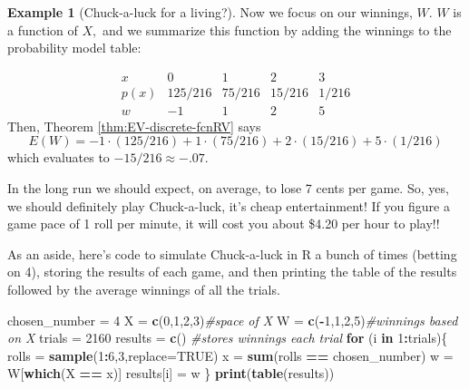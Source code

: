 \documentclass[
]{book}
\newenvironment{Shaded}{\begin{snugshade}}{\end{snugshade}}
\newcommand{\AttributeTok}[1]{\textcolor[rgb]{0.13,0.29,0.53}{#1}}
\newcommand{\CommentTok}[1]{\textcolor[rgb]{0.56,0.35,0.01}{\textit{#1}}}
\newcommand{\ConstantTok}[1]{\textcolor[rgb]{0.56,0.35,0.01}{#1}}
\newcommand{\ControlFlowTok}[1]{\textcolor[rgb]{0.13,0.29,0.53}{\textbf{#1}}}
\newcommand{\DecValTok}[1]{\textcolor[rgb]{0.00,0.00,0.81}{#1}}
\newcommand{\FunctionTok}[1]{\textcolor[rgb]{0.13,0.29,0.53}{\textbf{#1}}}
\newcommand{\NormalTok}[1]{#1}
\newcommand{\OtherTok}[1]{\textcolor[rgb]{0.56,0.35,0.01}{#1}}
\newcommand{\SpecialCharTok}[1]{\textcolor[rgb]{0.81,0.36,0.00}{\textbf{#1}}}
\theoremstyle{definition}
\theoremstyle{definition}
\newtheorem{example}{Example}[chapter]
\theoremstyle{definition}
\theoremstyle{definition}
\theoremstyle{remark}
\begin{document}
\begin{example}[Chuck-a-luck for a living?]
\protect\hypertarget{exm:Chuckaluck-winnings}{}\label{exm:Chuckaluck-winnings}Now we focus on our winnings, \(W\). \(W\) is a function of \(X,\) and we summarize this function by adding the winnings to the probability model table:

\[
\begin{array}{c|c|c|c|c}
x & 0 & 1 & 2 & 3 \\ \hline
p(x) & 125/216 & 75/216 & 15/216 & 1/216 \\ \hline
w & -1 & 1 & 2 & 5
\end{array}
\]
Then, Theorem \ref{thm:EV-discrete-fcnRV} says \[E(W) = -1\cdot(125/216) + 1 \cdot (75/216) + 2 \cdot (15/216) + 5\cdot (1/216)\] which evaluates to \(-15/216 \approx -.07\).

In the long run we should expect, on average, to lose 7 cents per game. So, yes, we should definitely play Chuck-a-luck, it's cheap entertainment! If you figure a game pace of 1 roll per minute, it will cost you about \$4.20 per hour to play!!
\end{example}

As an aside, here's code to simulate Chuck-a-luck in R a bunch of times (betting on 4), storing the results of each game, and then printing the table of the results followed by the average winnings of all the trials.

\begin{Shaded}
\begin{Highlighting}[]
\NormalTok{chosen\_number }\OtherTok{=} \DecValTok{4}
\NormalTok{X }\OtherTok{=} \FunctionTok{c}\NormalTok{(}\DecValTok{0}\NormalTok{,}\DecValTok{1}\NormalTok{,}\DecValTok{2}\NormalTok{,}\DecValTok{3}\NormalTok{)}\CommentTok{\#space of X}
\NormalTok{W }\OtherTok{=} \FunctionTok{c}\NormalTok{(}\SpecialCharTok{{-}}\DecValTok{1}\NormalTok{,}\DecValTok{1}\NormalTok{,}\DecValTok{2}\NormalTok{,}\DecValTok{5}\NormalTok{)}\CommentTok{\#winnings based on X}
\NormalTok{trials }\OtherTok{=} \DecValTok{2160}
\NormalTok{results }\OtherTok{=} \FunctionTok{c}\NormalTok{() }\CommentTok{\#stores winnings each trial }
\ControlFlowTok{for}\NormalTok{ (i }\ControlFlowTok{in} \DecValTok{1}\SpecialCharTok{:}\NormalTok{trials)\{}
\NormalTok{  rolls }\OtherTok{=} \FunctionTok{sample}\NormalTok{(}\DecValTok{1}\SpecialCharTok{:}\DecValTok{6}\NormalTok{,}\DecValTok{3}\NormalTok{,}\AttributeTok{replace=}\ConstantTok{TRUE}\NormalTok{)}
\NormalTok{  x }\OtherTok{=} \FunctionTok{sum}\NormalTok{(rolls }\SpecialCharTok{==}\NormalTok{ chosen\_number)}
\NormalTok{  w }\OtherTok{=}\NormalTok{ W[}\FunctionTok{which}\NormalTok{(X }\SpecialCharTok{==}\NormalTok{ x)]}
\NormalTok{  results[i] }\OtherTok{=}\NormalTok{ w}
\NormalTok{\}}
\FunctionTok{print}\NormalTok{(}\FunctionTok{table}\NormalTok{(results))}
\end{Highlighting}
\end{Shaded}
\end{document}
